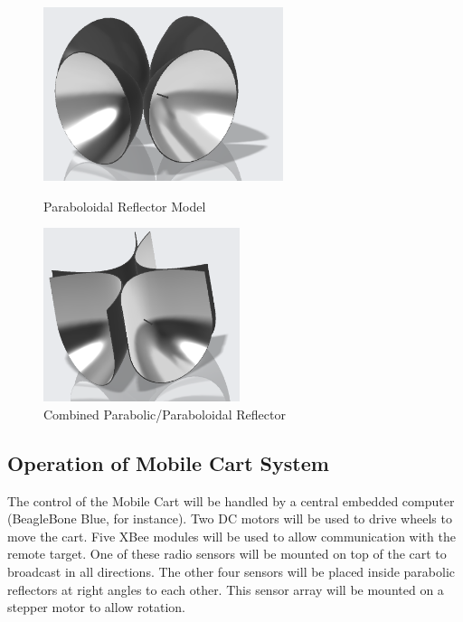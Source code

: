 \documentclass[letterpaper,12pt]{article}   %
\begin{document}
\begin{figure}[h!]
  \centering
  \begin{minipage}[t]{0.5\textwidth}
    \centering
    \includegraphics[height=2in]{figs/img/paraboloidalReflector}
    \captionsetup{width=\textwidth, justification=raggedright}
    \caption{Paraboloidal Reflector Model}
    \label{fig:parabolodialReflector}
  \end{minipage}
  \begin{minipage}[t]{0.4\textwidth}
    \centering
    \includegraphics[height=2in]{figs/img/parabolicReflector}
    \captionsetup{width=\textwidth, justification=raggedright}
    \caption{Combined Parabolic/Paraboloidal Reflector}
    \label{fig:parabolicReflector}
  \end{minipage}
\end{figure}

\subsection{Operation of Mobile Cart System}
The control of the Mobile Cart will be handled by a central embedded
computer (BeagleBone Blue, for instance). Two DC motors will be used to drive
wheels to move the cart. Five XBee modules will be used to allow communication
with the remote target. One of these radio sensors will be mounted on top of the
cart to broadcast in all directions. The other four sensors will be placed
inside parabolic reflectors at right angles to each other. This sensor array
will be mounted on a stepper motor to allow rotation.
\end{document}
